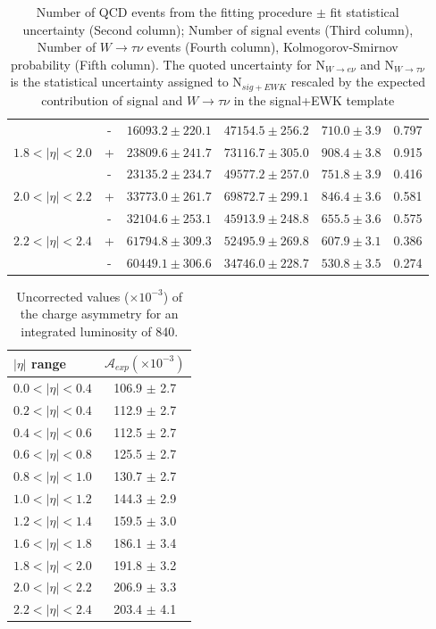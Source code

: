 \begin{table}[htbp]
\begin{center}
\begin{tabular}{lcrrrr}
                   &  -& $16093.2 \pm 220.1$ &$47154.5\pm256.2$&$ 710.0\pm3.9 $&0.797 \\ 
$1.8<| \eta |<2.0$ &  +& $23809.6 \pm 241.7$ &$73116.7\pm305.0$&$ 908.4\pm3.8 $&0.915 \\
                   &  -& $23135.2 \pm 234.7$ &$49577.2\pm257.0$&$ 751.8\pm3.9 $&0.416 \\ 
$2.0<| \eta |<2.2$ &  +& $33773.0 \pm 261.7$ &$69872.7\pm299.1$&$ 846.4\pm3.6 $&0.581 \\
                   &  -& $32104.6 \pm 253.1$ &$45913.9\pm248.8$&$ 655.5\pm3.6 $&0.575 \\ 
$2.2<| \eta |<2.4$ &  +& $61794.8 \pm 309.3$ &$52495.9\pm269.8$&$ 607.9\pm3.1 $&0.386 \\
                   &  -& $60449.1 \pm 306.6$ &$34746.0\pm228.7$&$ 530.8\pm3.5 $&0.274 \\ 
 \end{tabular}
 \caption{\label{tab:chi2}
 Number of QCD events from the fitting procedure $\pm$ fit statistical uncertainty (Second column);
   Number of signal events  (Third column), Number of $W\rightarrow \tau \nu$ events (Fourth column),
 Kolmogorov-Smirnov probability (Fifth column).
 The quoted uncertainty for N$_{W\rightarrow e \nu}$ and N$_{W\rightarrow \tau \nu}$
 is the statistical uncertainty assigned to N$_{sig+EWK}$
 rescaled by the expected contribution of signal and $W\rightarrow \tau \nu$ in the signal+EWK template}
 \end{center}
\end{table}

\begin{table}[htbp]
  \begin{center}
    \begin{tabular}{lc}
    $|\eta|$ range & $\mathcal{A}_{exp} (\times 10^{-3})$\\
    \hline
    $0.0<|\eta|<0.4$ & 106.9 $\pm$ 2.7\\
    $0.2<|\eta|<0.4$ & 112.9 $\pm$ 2.7\\
    $0.4<|\eta|<0.6$ & 112.5 $\pm$ 2.7\\
    $0.6<|\eta|<0.8$ & 125.5 $\pm$ 2.7\\
    $0.8<|\eta|<1.0$ & 130.7 $\pm$ 2.7\\
    $1.0<|\eta|<1.2$ & 144.3 $\pm$ 2.9\\
    $1.2<|\eta|<1.4$ & 159.5 $\pm$ 3.0 \\
    $1.6<|\eta|<1.8$ & 186.1 $\pm$ 3.4\\
    $1.8<|\eta|<2.0$ & 191.8 $\pm$ 3.2\\
    $2.0<|\eta|<2.2$ & 206.9 $\pm$ 3.3\\
    $2.2<|\eta|<2.4$ & 203.4 $\pm$ 4.1\\
    \end{tabular}
  \caption{\label{tab:uncorRes}Uncorrected values ($\times 10^{-3}$) of the
  charge asymmetry  for an integrated luminosity of \unit{840}{\invpb}. }
  \end{center}
\end{table}

